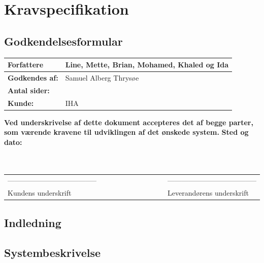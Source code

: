 
\chapter{Kravspecifikation}
\section{Godkendelsesformular}
\begin{table}[h!]
\label{tab:tabel2}
\begin{tabular}{| l | >{\raggedright\arraybackslash}p{12cm} |}
   \hline
   \textbf{Forfattere} & Line, Mette, Brian, Mohamed, Khaled og Ida\\ \hline
   \textbf{Godkendes af:} & Samuel Alberg Thrysøe\\ \hline
   \textbf{Antal sider:} & \\ \hline
   \textbf{Kunde:} & IHA\\ \hline
\end{tabular}
\end{table}
\textbf{Ved underskrivelse af dette dokument accepteres det af begge parter, som værende kravene til udviklingen af det ønskede system.}
\newline
\textbf{Sted og dato:}\\
\\
\\
\begin{table}
[h!]
\begin{tabular}{ l lllllllll l}
--------------------------------------&&&&&&&&&&--------------------------------------\\ 
Kundens underskrift &&&&&&&&&&Leverandørens underskrift\\
\end{tabular}
\end{table}
\section{Indledning}

\newpage

\section{Systembeskrivelse}

\newpage

